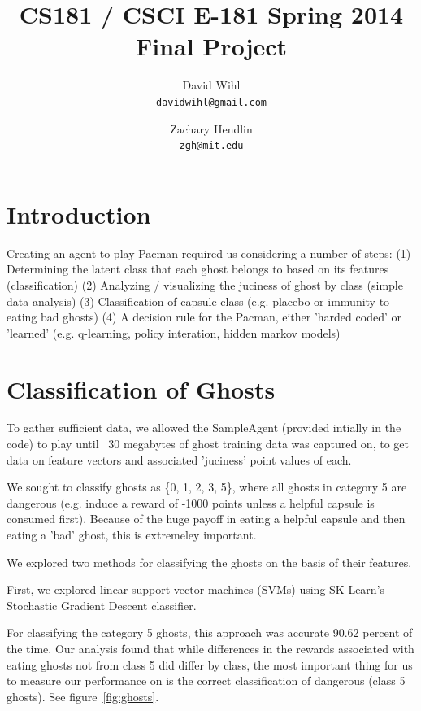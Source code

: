 \documentclass[11pt, oneside]{article}   	%
\title{CS181 / CSCI E-181 Spring 2014 Final Project}
\author{
  David Wihl\\
  \texttt{davidwihl@gmail.com}
  \and
  Zachary Hendlin\\
  \texttt{zgh@mit.edu} 
}
\begin{document}
\maketitle

\begingroup
\hypersetup{linkcolor=blue}
\tableofcontents
\endgroup

\section{Introduction}
Creating an agent to play Pacman required us considering a number of steps:
(1) Determining the latent class that each ghost belongs to based on its features (classification)
(2) Analyzing / visualizing the juciness of ghost by class (simple data analysis)
(3) Classification of capsule class (e.g. placebo or immunity to eating bad ghosts)
(4) A decision rule for the Pacman, either 'harded coded' or 'learned' (e.g. q-learning, policy interation, hidden markov models)

\section{Classification of Ghosts}
To gather sufficient data, we allowed the SampleAgent (provided intially in the code) to play until ~30 megabytes of ghost training data was captured on, to get data on feature vectors and associated 'juciness' point values of each.

We sought to classify ghosts as \{0, 1, 2, 3, 5\}, where all ghosts in category 5 are dangerous (e.g. induce a reward of -1000 points unless a helpful capsule is consumed first). Because of the huge payoff in eating a helpful capsule and then eating a 'bad' ghost, this is extremeley important.

We explored two methods for classifying the ghosts on the basis of their features.

First, we explored linear support vector machines (SVMs) using SK-Learn's Stochastic Gradient Descent classifier.

For classifying the category 5 ghosts, this approach was accurate 90.62 percent of the time. Our analysis found that while differences in the rewards associated with eating ghosts not from class 5 did differ by class, the most important thing for us to measure our performance on is the correct classification of dangerous (class 5 ghosts). See figure~\ref{fig:ghosts}.
\end{document}
